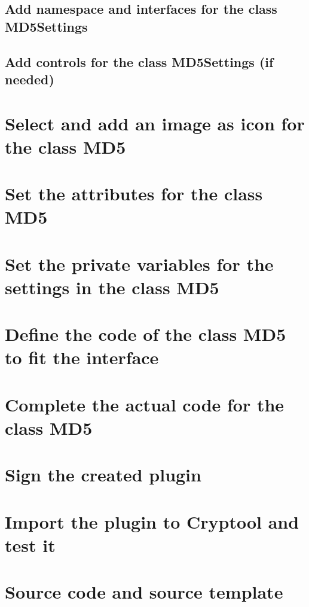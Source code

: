 \subsection{Add namespace and interfaces for the class MD5Settings}\label{sec:AddNamespaceAndInterfacesForTheClassMD5Settings}
\subsection{Add controls for the class MD5Settings (if needed)}\label{sec:AddControlsForTheClassMD5SettingsIfNeeded}
\section{Select and add an image as icon for the class MD5}\label{sec:SelectAndAddAnImageAsIconForTheClassMD5}
\section{Set the attributes for the class MD5}\label{sec:SetTheAttributesForTheClassMD5}
\section{Set the private variables for the settings in the class MD5}
\label{sec:SetThePrivateVariablesForTheSettingsInTheClassMD5}
\section{Define the code of the class MD5 to fit the interface}\label{sec:DefineTheCodeOfTheClassMD5ToFitTheInterface}
\section{Complete the actual code for the class MD5}\label{sec:CompleteTheActualCodeForTheClassMD5}
\section{Sign the created plugin}\label{sec:SignTheCreatedPlugin}
\section{Import the plugin to Cryptool and test it}\label{sec:ImportThePluginToCryptoolAndTestIt}
\section{Source code and source template}\label{sec:SourceCodeAndSourceTemplate}
